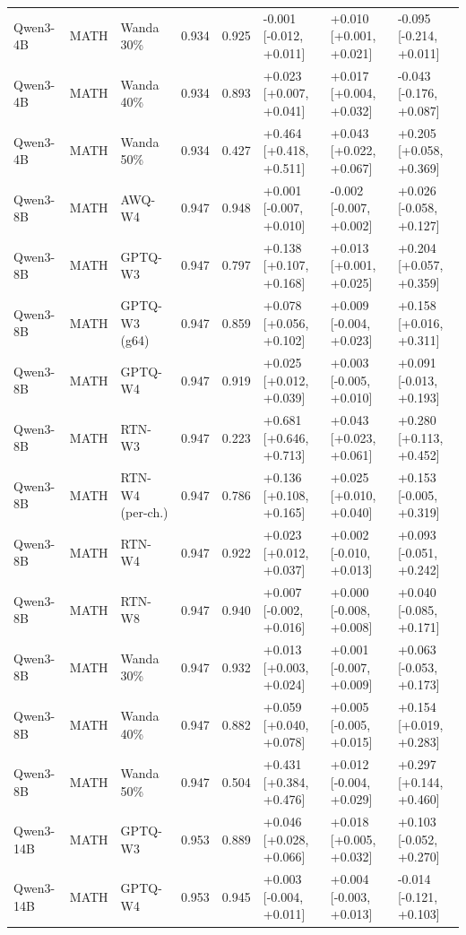 \begin{tabular}{lllrrlll}
Qwen3-4B & MATH & Wanda 30\% & 0.934 & 0.925 & -0.001 [-0.012, +0.011] & +0.010 [+0.001, +0.021] & -0.095 [-0.214, +0.011] \\
Qwen3-4B & MATH & Wanda 40\% & 0.934 & 0.893 & +0.023 [+0.007, +0.041] & +0.017 [+0.004, +0.032] & -0.043 [-0.176, +0.087] \\
Qwen3-4B & MATH & Wanda 50\% & 0.934 & 0.427 & +0.464 [+0.418, +0.511] & +0.043 [+0.022, +0.067] & +0.205 [+0.058, +0.369] \\
Qwen3-8B & MATH & AWQ-W4 & 0.947 & 0.948 & +0.001 [-0.007, +0.010] & -0.002 [-0.007, +0.002] & +0.026 [-0.058, +0.127] \\
Qwen3-8B & MATH & GPTQ-W3 & 0.947 & 0.797 & +0.138 [+0.107, +0.168] & +0.013 [+0.001, +0.025] & +0.204 [+0.057, +0.359] \\
Qwen3-8B & MATH & GPTQ-W3 (g64) & 0.947 & 0.859 & +0.078 [+0.056, +0.102] & +0.009 [-0.004, +0.023] & +0.158 [+0.016, +0.311] \\
Qwen3-8B & MATH & GPTQ-W4 & 0.947 & 0.919 & +0.025 [+0.012, +0.039] & +0.003 [-0.005, +0.010] & +0.091 [-0.013, +0.193] \\
Qwen3-8B & MATH & RTN-W3 & 0.947 & 0.223 & +0.681 [+0.646, +0.713] & +0.043 [+0.023, +0.061] & +0.280 [+0.113, +0.452] \\
Qwen3-8B & MATH & RTN-W4 (per-ch.) & 0.947 & 0.786 & +0.136 [+0.108, +0.165] & +0.025 [+0.010, +0.040] & +0.153 [-0.005, +0.319] \\
Qwen3-8B & MATH & RTN-W4 & 0.947 & 0.922 & +0.023 [+0.012, +0.037] & +0.002 [-0.010, +0.013] & +0.093 [-0.051, +0.242] \\
Qwen3-8B & MATH & RTN-W8 & 0.947 & 0.940 & +0.007 [-0.002, +0.016] & +0.000 [-0.008, +0.008] & +0.040 [-0.085, +0.171] \\
Qwen3-8B & MATH & Wanda 30\% & 0.947 & 0.932 & +0.013 [+0.003, +0.024] & +0.001 [-0.007, +0.009] & +0.063 [-0.053, +0.173] \\
Qwen3-8B & MATH & Wanda 40\% & 0.947 & 0.882 & +0.059 [+0.040, +0.078] & +0.005 [-0.005, +0.015] & +0.154 [+0.019, +0.283] \\
Qwen3-8B & MATH & Wanda 50\% & 0.947 & 0.504 & +0.431 [+0.384, +0.476] & +0.012 [-0.004, +0.029] & +0.297 [+0.144, +0.460] \\
Qwen3-14B & MATH & GPTQ-W3 & 0.953 & 0.889 & +0.046 [+0.028, +0.066] & +0.018 [+0.005, +0.032] & +0.103 [-0.052, +0.270] \\
Qwen3-14B & MATH & GPTQ-W4 & 0.953 & 0.945 & +0.003 [-0.004, +0.011] & +0.004 [-0.003, +0.013] & -0.014 [-0.121, +0.103] \\

\end{tabular}
